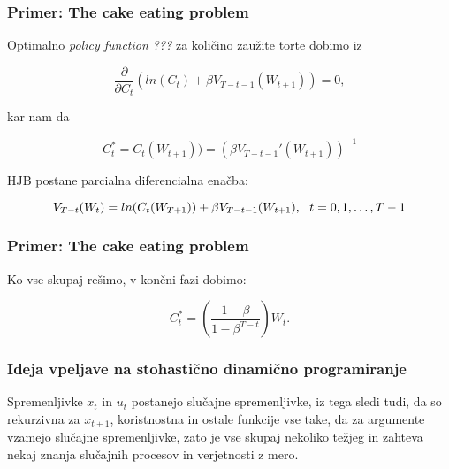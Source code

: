 \documentclass{beamer}
\begin{document}
\begin{frame}
\frametitle{Primer: The cake eating problem}
Optimalno \textit{policy function ???} za količino zaužite torte dobimo iz

\begin{equation}
\frac{\partial}{\partial C_t}(ln(C_t) +  \beta V_{T-t-1}(W_{t+1})) = 0,
\end{equation}

kar nam da

\begin{equation}
C_t^* = C_t(W_{t+1})) =  (\beta V_{T-t-1}' (W_{t+1})) ^{-1}
\end{equation} \newline

HJB postane parcialna diferencialna enačba:

\begin{equation}
V_{T-t}(W_t) = ln(C_t(W_{T+1})) + \beta V_{T-t-1}(W_{t+1}), \-\ \-\ t = 0,1, \ldots, T-1
\end{equation}

\end{frame}

\begin{frame}
\frametitle{Primer: The cake eating problem}
Ko vse skupaj rešimo, v končni fazi dobimo:

\begin{equation}
C_t^* = \left( \frac{1- \beta }{1- \beta^{T-t}} \right) W_t.
\end{equation}

\end{frame}



\begin{frame}
\frametitle{Ideja vpeljave na stohastično dinamično programiranje}

Spremenljivke $x_t$ in $u_t$ postanejo slučajne spremenljivke, iz tega sledi tudi, da so rekurzivna za $x_{t+1}$, koristnostna in ostale funkcije vse take, da za argumente vzamejo slučajne spremenljivke, zato je vse skupaj nekoliko težjeg in zahteva nekaj znanja slučajnih procesov in verjetnosti z mero.

\end{frame}
\end{document}
